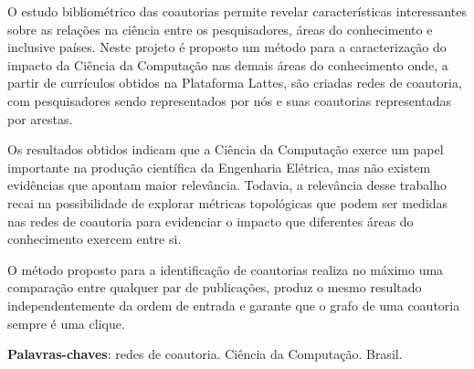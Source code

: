 
\setlength{\absparsep}{18pt} %
\begin{resumo}
    O estudo bibliométrico das coautorias permite revelar características interessantes sobre as relações na ciência entre os pesquisadores, áreas do conhecimento e inclusive países. Neste projeto é proposto um método para a caracterização do impacto da Ciência da Computação nas demais áreas do conhecimento onde, a partir de currículos obtidos na Plataforma Lattes, são criadas redes de coautoria, com pesquisadores sendo representados por nós e suas coautorias representadas por arestas.
    
    Os resultados obtidos indicam que a Ciência da Computação exerce um papel importante na produção científica da Engenharia Elétrica, mas não existem evidências que apontam maior relevância. Todavia, a relevância desse trabalho recai na possibilidade de explorar métricas topológicas que podem ser medidas nas redes de coautoria para evidenciar o impacto que diferentes áreas do conhecimento exercem entre si.
    
    O método proposto para a identificação de coautorias realiza no máximo uma comparação entre qualquer par de publicações, produz o mesmo resultado independentemente da ordem de entrada e garante que o grafo de uma coautoria sempre é uma clique.
    
    \textbf{Palavras-chaves}: redes de coautoria. Ciência da Computação. Brasil.
\end{resumo}
